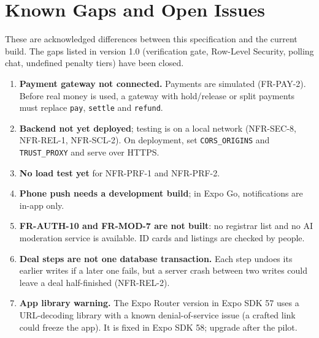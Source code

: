 \documentclass[11pt,a4paper]{scrreprt}
\begin{document}
\chapter{Known Gaps and Open Issues}\label{app:gaps}
These are acknowledged differences between this specification and the
current build. The gaps listed in version 1.0 (verification gate, Row-Level
Security, polling chat, undefined penalty tiers) have been closed.
\begin{enumerate}
  \item \textbf{Payment gateway not connected.} Payments are simulated
    (FR-PAY-2). Before real money is used, a gateway with hold/release or
    split payments must replace \texttt{pay}, \texttt{settle} and
    \texttt{refund}.
  \item \textbf{Backend not yet deployed}; testing is on a local network
    (NFR-SEC-8, NFR-REL-1, NFR-SCL-2). On deployment, set
    \texttt{CORS_ORIGINS} and \texttt{TRUST_PROXY} and serve over HTTPS.
  \item \textbf{No load test yet} for NFR-PRF-1 and NFR-PRF-2.
  \item \textbf{Phone push needs a development build}; in Expo Go,
    notifications are in-app only.
  \item \textbf{FR-AUTH-10 and FR-MOD-7 are not built}: no registrar list
    and no AI moderation service is available. ID cards and listings are
    checked by people.
  \item \textbf{Deal steps are not one database transaction.} Each step undoes
    its earlier writes if a later one fails, but a server crash between two
    writes could leave a deal half-finished (NFR-REL-2).
  \item \textbf{App library warning.} The Expo Router version in Expo SDK 57
    uses a URL-decoding library with a known denial-of-service issue (a
    crafted link could freeze the app). It is fixed in Expo SDK 58; upgrade
    after the pilot.
\end{enumerate}
\end{document}
